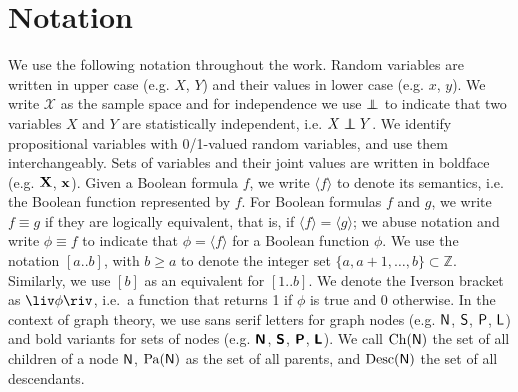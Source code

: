 

\section*{Notation}

We use the following notation throughout the work. Random variables are written in upper case (e.g.
$X$, $Y$) and their values in lower case (e.g. $x$, $y$). We write $\mathcal{X}$ as the sample
space and for independence we use $\indep$ to indicate that two variables $X$ and $Y$ are
statistically independent, i.e. $X\indep Y$. We identify propositional variables with 0/1-valued
random variables, and use them interchangeably.  Sets of variables and their joint values are
written in boldface (e.g. $\mathbf{X}$, $\mathbf{x}$). Given a Boolean formula $f$, we write $\langle
f\rangle$ to denote its semantics, i.e. the Boolean function represented by $f$. For Boolean
formulas $f$ and $g$, we write $f\equiv g$ if they are logically equivalent, that is, if $\langle
f\rangle = \langle g\rangle$; we abuse notation and write $\phi\equiv f$ to indicate that $\phi=
\langle f\rangle$ for a Boolean function $\phi$. We use the notation $[a..b]$, with $b\geq
a$ to denote the integer set $\{a,a+1,\ldots,b\}\subset\mathbb{Z}$. Similarly, we use $[b]$ as an
equivalent for $[1..b]$. We denote the Iverson bracket as $\liv\phi\riv$, i.e.\ a function that
returns 1 if $\phi$ is true and 0 otherwise. In the context of graph theory, we use sans serif
letters for graph nodes (e.g. $\operatorname{\textsf{N}}$, $\operatorname{\textsf{S}}$, $\operatorname{\textsf{P}}$, $\operatorname{\textsf{L}}$) and bold variants for sets of
nodes (e.g. $\operatorname{\textsf{\textbf{N}}}$, $\operatorname{\textsf{\textbf{S}}}$, $\operatorname{\textsf{\textbf{P}}}$, $\operatorname{\textsf{\textbf{L}}}$). We call $\operatorname*{\normalfont{Ch}}(\operatorname{\textsf{N}})$ the set of all children
of a node $\operatorname{\textsf{N}}$, $\operatorname*{\normalfont{Pa}}(\operatorname{\textsf{N}})$ as the set of all parents, and $\operatorname*{\normalfont{Desc}}(\operatorname{\textsf{N}})$ the set of all
descendants.

\tableofcontents

\egroup %


